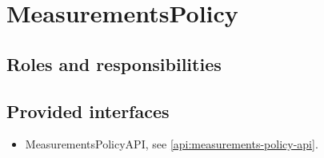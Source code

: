 \section{MeasurementsPolicy}
\label{element:measurements-policy}

\subsection{Roles and responsibilities}

\npar %

\subsection{Provided interfaces}

\begin{itemize}
  \item MeasurementsPolicyAPI, see \ref{api:measurements-policy-api}.
\end{itemize}